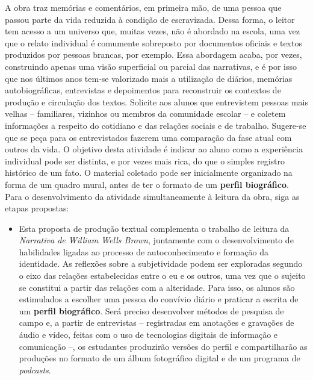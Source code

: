 \documentclass[11pt]{extarticle}
\begin{document}
A obra traz memórias e comentários, em primeira mão, de uma
pessoa que passou parte da vida reduzida à condição de escravizada.
Dessa forma, o leitor tem acesso a um universo que, muitas vezes, não é
abordado na escola, uma vez que o relato individual é comumente
sobreposto por documentos oficiais e textos produzidos por pessoas
brancas, por exemplo. Essa abordagem acaba, por vezes, construindo
apenas uma visão superficial ou parcial das narrativas, e é por isso que
nos últimos anos tem-se valorizado mais a utilização de diários,
memórias autobiográficas, entrevistas e depoimentos para reconstruir os
contextos de produção e circulação dos textos. Solicite aos alunos que
entrevistem pessoas mais velhas -- familiares, vizinhos ou membros da
comunidade escolar -- e coletem informações a respeito do cotidiano e
das relações sociais e de trabalho. Sugere-se que se peça para os
entrevistados fazerem uma comparação da fase atual com outros da vida. O
objetivo desta atividade é indicar ao aluno como a experiência
individual pode ser distinta, e por vezes mais rica, do que o simples
registro histórico de um fato. O material coletado pode ser inicialmente
organizado na forma de um quadro mural, antes de ter o formato de um
\textbf{perfil biográfico}. Para o desenvolvimento da atividade
simultaneamente à leitura da obra, siga as etapas propostas:


\begin{itemize}
\item
  Esta proposta de produção textual complementa o trabalho de leitura da
  \emph{Narrativa de William Wells Brown}, juntamente com o
  desenvolvimento de habilidades ligadas ao processo de autoconhecimento
  e formação da identidade. As reflexões sobre a subjetividade podem ser
  exploradas segundo o eixo das relações estabelecidas entre o eu e os
  outros, uma vez que o sujeito se constitui a partir das relações com a
  alteridade. Para isso, os alunos são estimulados a escolher uma pessoa
  do convívio diário e praticar a escrita de um \textbf{perfil
  biográfico}. Será preciso desenvolver métodos de pesquisa de campo e,
  a partir de entrevistas -- registradas em anotações e gravações de
  áudio e vídeo, feitas com o uso de tecnologias digitais de informação
  e comunicação --, os estudantes produzirão versões do perfil e
  compartilharão as produções no formato de um álbum fotográfico digital
  e de um programa de \emph{podcasts}.
\end{itemize}
\end{document}
